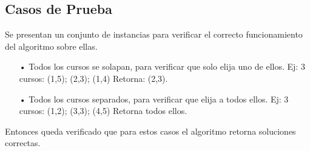 \subsection{Casos de Prueba}

Se presentan un conjunto de instancias para verificar el correcto funcionamiento del algoritmo sobre ellas.

\begin{itemize}
\item[•]Todos los cursos se solapan, para verificar que solo elija uno de ellos.
Ej: 3 cursos: (1,5); (2,3); (1,4) Retorna: (2,3).
\item[•]Todos los cursos separados, para verificar que elija a todos ellos.
Ej: 3 cursos: (1,2); (3,3); (4,5) Retorna todos ellos.
\end{itemize}
Entonces queda verificado que para estos casos el algoritmo retorna soluciones correctas.\\


